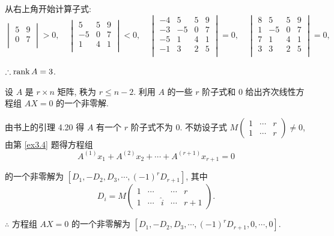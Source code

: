 \documentclass[color=black,device=normal,lang=cn,mode=geye]{elegantnote}
\begin{document}
\begin{solution}
    从右上角开始计算子式:
    \[\begin{vmatrix}
        5 & 9 \\
        0 & 7 \\
    \end{vmatrix}>0,\quad\begin{vmatrix}
        5 & 5 & 9 \\
        -5 & 0 & 7 \\
        1 & 4 & 1 \\
    \end{vmatrix}<0,\quad\begin{vmatrix}
        -4 & 5 & 5 & 9 \\
        -3 & -5 & 0 & 7 \\
        -5 & 1 & 4 & 1 \\
        -1 & 3 & 2 & 5 \\
    \end{vmatrix}=0,\quad\begin{vmatrix}
        8 & 5 & 5 & 9 \\
        1 & -5 & 0 & 7 \\
        7 & 1 & 4 & 1 \\
        3 & 3 & 2 & 5 \\
    \end{vmatrix}=0,\]

    $\therefore\operatorname{rank} A=3$.
\end{solution}
\begin{exercisec}[4.3.5]
    设 $A$ 是 $r\times n$ 矩阵, 秩为 $r\leq n-2$. 利用 $A$ 的一些 $r$ 阶子式和 $0$ 给出齐次线性方程组 $AX=0$ 的一个非零解.
\end{exercisec}
\begin{solution}
    由书上的引理 4.20 得 $A$ 有一个 $r$ 阶子式不为 $0$. 不妨设子式 $M\begin{pmatrix} 1 & \cdots & r \\ 1 & \cdots & r \end{pmatrix}\neq0$, 由第 \ref{ex3.4} 题得方程组
    \[A^{(1)}x_1+A^{(2)}x_2+\cdots+A^{(r+1)}x_{r+1}=0\]

    的一个非零解为 $[D_1,-D_2,D_3,\cdots,(-1)^rD_{r+1}]$, 其中
    \[D_i=M\begin{pmatrix}
        1 & \cdots && \cdots & r \\
        1 & \cdots & \hat{i} & \cdots & r+1
    \end{pmatrix}.\]
    
    $\therefore$ 方程组 $AX=0$ 的一个非零解为 $[D_1,-D_2,D_3,\cdots,(-1)^rD_{r+1},0,\cdots,0]$.
\end{solution}
\end{document}
